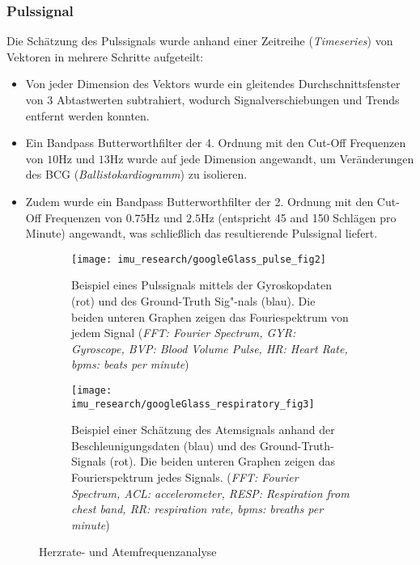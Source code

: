 \subsubsection{Pulssignal}
Die Schätzung des Pulssignals wurde anhand einer Zeitreihe (\textit{Timeseries}) von Vektoren in mehrere Schritte aufgeteilt:
\begin{itemize}
    \item Von jeder Dimension des Vektors wurde ein gleitendes Durchschnittsfenster von 3 Abtastwerten subtrahiert, wodurch Signalverschiebungen und Trends entfernt werden konnten.
    \item Ein Bandpass Butterworthfilter der 4. Ordnung mit den Cut-Off Frequenzen von $10 \si{\hertz}$ und $13 \si{\hertz}$ wurde auf jede Dimension angewandt, um Veränderungen des BCG (\textit{Ballistokardiogramm}) zu isolieren.
    \item Zudem wurde ein Bandpass Butterworthfilter der 2. Ordnung mit den Cut-Off Frequenzen von $0.75 \si{\hertz}$ und $2.5 \si{\hertz}$ (entspricht 45 and 150 Schlägen pro Minute) angewandt, was schließlich das resultierende Pulssignal liefert.
\end{itemize}

\begin{figure}[ht]
    \centering
    \begin{subfigure}{.49\textwidth}
        \texttt{[image: imu\_research/googleGlass\_pulse\_fig2]}
      \caption{Beispiel eines Pulssignals mittels der Gyroskopdaten (rot) und des Ground-Truth Sig"-nals (blau). Die beiden unteren Graphen zeigen das Fouriespektrum von jedem Signal (\textit{FFT: Fourier Spectrum, GYR: Gyroscope, BVP: Blood Volume Pulse, HR: Heart Rate, bpms: beats per minute})}
      \label{background:googleGlass:pulse_wave}
    \end{subfigure}
    \begin{subfigure}{.49\textwidth}
        \texttt{[image: imu\_research/googleGlass\_respiratory\_fig3]}
      \caption{Beispiel einer Schätzung des Atemsignals anhand der Beschleunigungsdaten (blau) und des Ground-Truth-Signals (rot). Die beiden unteren Graphen zeigen das Fourierspektrum jedes Signals. (\textit{FFT: Fourier Spectrum, ACL: accelerometer, RESP: Respiration from chest band, RR: respiration rate, bpms: breaths per minute})}
      \label{background:googleGlass:respiratory_wave}
    \end{subfigure}
    \caption{Herzrate- und Atemfrequenzanalyse}
    \label{background:googleGlass}
  \end{figure}

